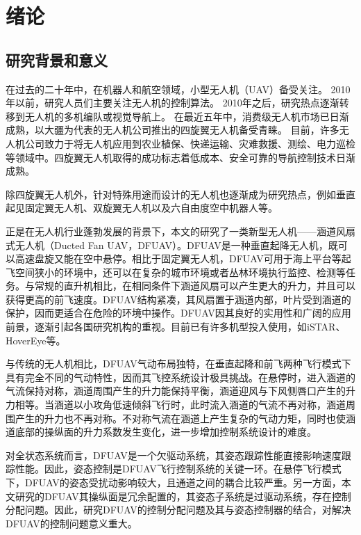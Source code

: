 \chapter{绪论}
%
\section{研究背景和意义}
%
在过去的二十年中，在机器人和航空领域，小型无人机（UAV）备受关注。 2010年以前，研究人员们主要关注无人机的控制算法\cite{Bouabdallah_2004,Castillo_2004}。 2010年之后，研究热点逐渐转移到无人机的多机编队\cite{Dong_2016,Wang_2012}或视觉导航\cite{Krajnik_2012,Lee_2012}上。 在最近五年中，消费级无人机市场已日渐成熟，以大疆为代表的无人机公司推出的四旋翼无人机备受青睐。 目前，许多无人机公司致力于将无人机应用到农业植保、快递运输、灾难救援、测绘、电力巡检等领域中。四旋翼无人机取得的成功标志着低成本、安全可靠的导航控制技术日渐成熟。

除四旋翼无人机外，针对特殊用途而设计的无人机也逐渐成为研究热点，例如垂直起见固定翼无人机\cite{Roberts_2010}、双旋翼无人机\cite{Siddhardha_2018}以及六自由度空中机器人\cite{Kamel_2018,Scholz_2016}等。

正是在无人机行业蓬勃发展的背景下，本文的研究了一类新型无人机——涵道风扇式无人机（Ducted Fan UAV，DFUAV）。DFUAV是一种垂直起降无人机，既可以高速盘旋又能在空中悬停。相比于固定翼无人机，DFUAV可用于海上平台等起飞空间狭小的环境中，还可以在复杂的城市环境或者丛林环境执行监控、检测等任务。与常规的直升机相比，在相同条件下涵道风扇可以产生更大的升力，并且可以获得更高的前飞速度。DFUAV结构紧凑，其风扇置于涵道内部，叶片受到涵道的保护，因而更适合在危险的环境中操作。DFUAV因其良好的实用性和广阔的应用前景，逐渐引起各国研究机构的重视。目前已有许多机型投入使用，如iSTAR\cite{Lipera_2001}、HoverEye\cite{Binetti_2007}等。

与传统的无人机相比，DFUAV气动布局独特，在垂直起降和前飞两种飞行模式下具有完全不同的气动特性\cite{Johnson_2005}，因而其飞控系统设计极具挑战。在悬停时，进入涵道的气流保持对称，涵道周围产生的升力能保持平衡，涵道迎风与下风侧唇口产生的升力相等。当涵道以小攻角低速倾斜飞行时，此时流入涵道的气流不再对称，涵道周围产生的升力也不再对称\cite{Fleming_2004}。不对称气流在涵道上产生复杂的气动力矩，同时也使涵道底部的操纵面的升力系数发生变化，进一步增加控制系统设计的难度。

对全状态系统而言，DFUAV是一个欠驱动系统，其姿态跟踪性能直接影响速度跟踪性能。因此，姿态控制是DFUAV飞行控制系统的关键一环。在悬停飞行模式下，DFUAV的姿态受扰动影响较大，且通道之间的耦合比较严重。另一方面，本文研究的DFUAV其操纵面是冗余配置的，其姿态子系统是过驱动系统，存在控制分配问题。因此，研究DFUAV的控制分配问题及其与姿态控制器的结合，对解决DFUAV的控制问题意义重大。
